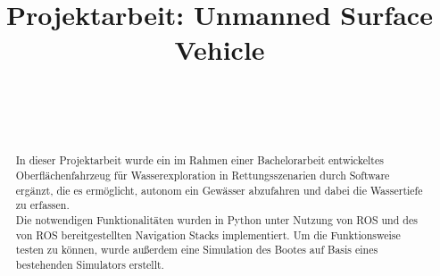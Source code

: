 \documentclass[conference]{IEEEtran}
\begin{document}
\title{Projektarbeit: Unmanned Surface Vehicle\\
}

\author{
\\
\and
{}
\\
}

\maketitle

\begin{abstract}
In dieser Projektarbeit wurde ein im Rahmen einer Bachelorarbeit entwickeltes Oberflächenfahrzeug für Wasserexploration in Rettungsszenarien durch Software ergänzt, die es ermöglicht, autonom ein Gewässer abzufahren und dabei die Wassertiefe zu erfassen.\\
Die notwendigen Funktionalitäten wurden in Python unter Nutzung von ROS und des von ROS bereitgestellten Navigation Stacks implementiert. Um die Funktionsweise testen zu können, wurde außerdem eine Simulation des Bootes auf Basis eines bestehenden Simulators erstellt.\\
\end{abstract}
\end{document}
